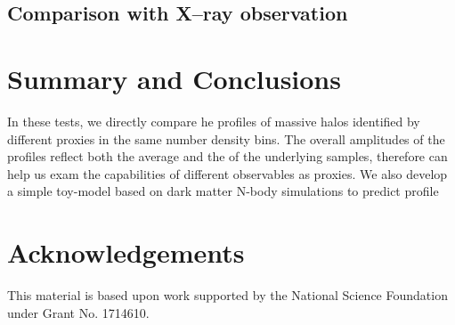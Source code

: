 \documentclass[a4paper,fleqn,usenatbib]{mnras}
\begin{document}
\subsection{Comparison with X--ray observation}
    \label{sec:xray}



\section{Summary and Conclusions}
    \label{sec:summary}
    

    In these tests, we directly compare he \dsigma{} profiles of massive halos identified 
    by different \mvir{} proxies in the same number density bins. 
    The overall amplitudes of the \dsigma{} profiles reflect both the average \mvir{} and the 
    \sighalo{} of the underlying samples, therefore can help us exam the capabilities of 
    different observables as \mvir{} proxies.
    We also develop a simple toy-model based on dark matter N-body simulations to predict 
    \dsigma{} profile


\section*{Acknowledgements}


  This material is based upon work supported by the National Science Foundation under 
  Grant No. 1714610. 
  
\end{document}
